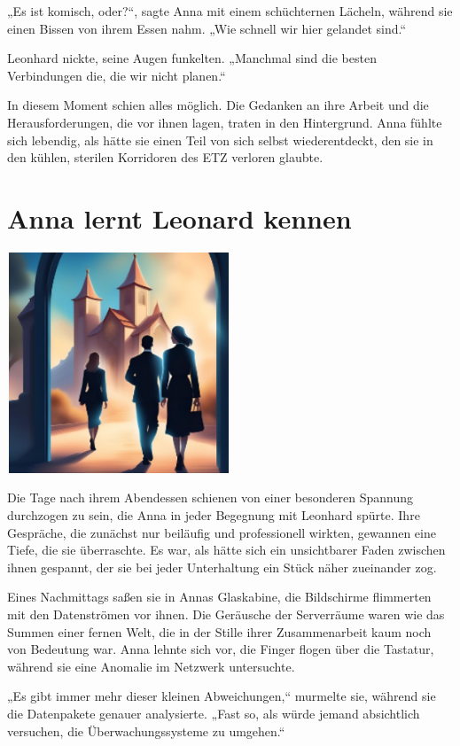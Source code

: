 \documentclass[
]{article}
\begin{document}
„Es ist komisch, oder?{\kern0pt}``, sagte Anna mit einem schüchternen
Lächeln, während sie einen Bissen von ihrem Essen nahm. „Wie schnell wir
hier gelandet sind.``

Leonhard nickte, seine Augen funkelten. „Manchmal sind die besten
Verbindungen die, die wir nicht planen.``

In diesem Moment schien alles möglich. Die Gedanken an ihre Arbeit und
die Herausforderungen, die vor ihnen lagen, traten in den Hintergrund.
Anna fühlte sich lebendig, als hätte sie einen Teil von sich selbst
wiederentdeckt, den sie in den kühlen, sterilen Korridoren des ETZ
verloren glaubte.

\section{Anna lernt Leonard kennen}\label{anna-lernt-leonard-kennen}

\includegraphics[width=2.625in,height=2.59375in]{media/image5.png}

Die Tage nach ihrem Abendessen schienen von einer besonderen Spannung
durchzogen zu sein, die Anna in jeder Begegnung mit Leonhard spürte.
Ihre Gespräche, die zunächst nur beiläufig und professionell wirkten,
gewannen eine Tiefe, die sie überraschte. Es war, als hätte sich ein
unsichtbarer Faden zwischen ihnen gespannt, der sie bei jeder
Unterhaltung ein Stück näher zueinander zog.

Eines Nachmittags saßen sie in Annas Glaskabine, die Bildschirme
flimmerten mit den Datenströmen vor ihnen. Die Geräusche der Serverräume
waren wie das Summen einer fernen Welt, die in der Stille ihrer
Zusammenarbeit kaum noch von Bedeutung war. Anna lehnte sich vor, die
Finger flogen über die Tastatur, während sie eine Anomalie im Netzwerk
untersuchte.

„Es gibt immer mehr dieser kleinen Abweichungen,`` murmelte sie, während
sie die Datenpakete genauer analysierte. „Fast so, als würde jemand
absichtlich versuchen, die Überwachungssysteme zu umgehen.``
\end{document}
